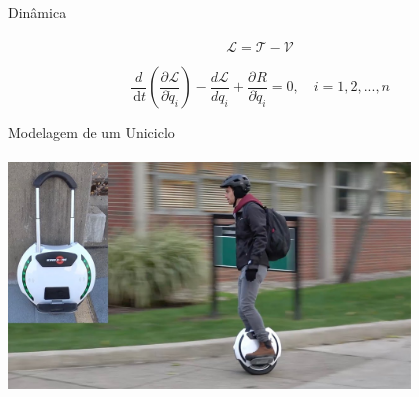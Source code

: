 \documentclass{beamer}
\newcommand{\df}[1]{\,\mathrm{d}#1}
\newcommand{\parcial}[3]{\dfrac{\partial^{#1}#2}{\partial #3^{#1}}}
\begin{document}
\begin{frame}{{Dinâmica}}
    \framesubtitle{}

    \begin{equation}
        \mathcal{L}= \mathcal{T} - \mathcal{V}
    \end{equation}
    
    \begin{equation}\label{eq:hamiles3}
        \frac{d}{\df{t}}\left( \parcial{}{\mathcal{L}}{\dot{q}_i}\right) - \frac{d \mathcal{L}}{d q_i} + \parcial{}{R}{\dot{q}_i}= 0, \quad i = 1,2,...,n
        \end{equation}
        
\end{frame}



\begin{frame}[c]{{Modelagem de um Uniciclo}}
    \framesubtitle{}
    \centering
    \includegraphics[width=0.8\textwidth]{images/unicycle.jpg}
\end{frame}
\end{document}
